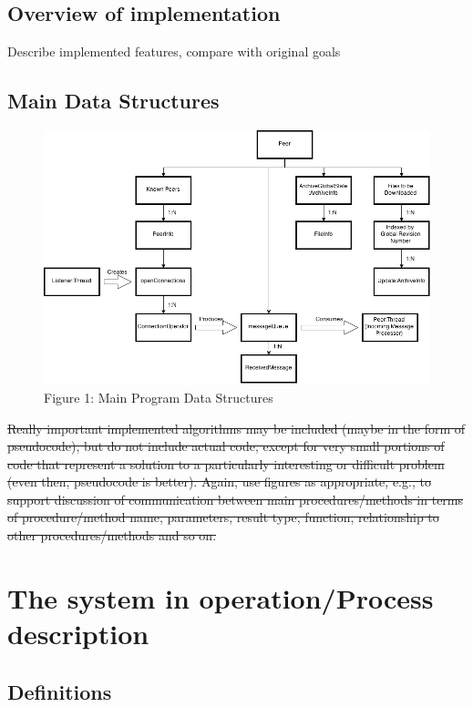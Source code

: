 \documentclass[12pt,a4paper,]{book}
\begin{document}
\subsection{Overview of
implementation}\label{overview-of-implementation}

Describe implemented features, compare with original goals

\subsection{Main Data Structures}\label{main-data-structures}

\begin{figure}[htbp]
\centering
\includegraphics{strucs.png}
\caption{Figure 1: Main Program Data Structures}
\end{figure}

\sout{Really important implemented algorithms may be included (maybe in
the form of pseudocode), but do not include actual code, except for very
small portions of code that represent a solution to a particularly
interesting or difficult problem (even then, pseudocode is better).
Again, use figures as appropriate, e.g., to support discussion of
communication between main procedures/methods in terms of
procedure/method name, parameters, result type, function, relationship
to other procedures/methods and so on.}

\section{The system in operation/Process
description}\label{the-system-in-operationprocess-description}

\subsection{Definitions}\label{definitions}
\end{document}
